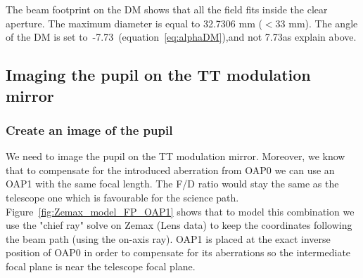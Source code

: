 \documentclass[12pt,a4paper]{article}
\begin{document}
The beam footprint on the DM shows that all the field fits inside the clear aperture. The maximum diameter is equal to 32.7306 mm ($< 33$ mm). The angle of the DM is set to~-7.73\degree~(equation~\eqref{eq:alphaDM}),and not 7.73\degree as explain above.

\subsection{Imaging the pupil on the TT modulation mirror}

\subsubsection{Create an image of the pupil}
We need to image the pupil on the TT modulation mirror. Moreover, we know that to compensate for the introduced aberration from OAP0 we can use an OAP1 with the same focal length. The F/D ratio would stay the same as the telescope one which is favourable for the science path.\\
Figure~\ref{fig:Zemax_model_FP_OAP1} shows that to model this combination we use the "chief ray" solve on Zemax (Lens data) to keep the coordinates following the beam path (using the on-axis ray). OAP1 is placed at the exact inverse position of OAP0 in order to compensate for its aberrations so the intermediate focal plane is near the telescope focal plane.\\
\end{document}
